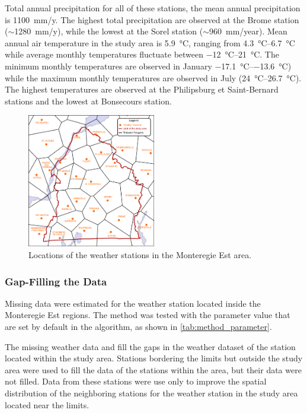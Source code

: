 \documentclass[TechnicalNoteMeteo.tex]{subfiles}
\begin{document}
Total annual precipitation for all of these stations, the mean annual precipitation is \SI{1100}{mm/y}. The highest total precipitation are observed at the Brome station ($\sim$\SI{1280}{mm/y}), while the lowest at the Sorel station ($\sim$\SI{960}{mm/year}). Mean annual air temperature in the study area is \SI{5.9}{\celsius}, ranging from \SIrange{4.3}{6.7}{\celsius} while average monthly temperatures fluctuate between \SIrange{-12}{21}{\celsius}. The minimum monthly temperatures are observed in January \SIrange{-17.1}{-13.6}{\celsius}) while the maximum monthly temperatures are observed in July (\SIrange{24}{26.7}{\celsius}).
The highest temperatures are observed at the Philipsburg et Saint-Bernard stations and the lowest at Bonsecours station.

\begin{figure}
    \centering
    \includegraphics[width=0.5\textwidth]{img/Thiessen_meteo}
    \caption[Locations of the weather stations in the Monteregie Est area.]{Locations of the weather stations in the Monteregie Est area.}
    \label{fig:Thiessen_meteo}
\end{figure}

\subsubsection{Gap-Filling the Data}

Missing data were estimated for the weather station located inside the Monteregie Est regions. The method was tested with the parameter value that are set by default in the algorithm, as shown in \cref{tab:method_parameter}.

The missing weather data and fill the gaps in the weather dataset of the station located within the study area. Stations bordering the limits but outside the study area were used to fill the data of the stations within the area, but their data were not filled. Data from these stations were use only to improve the spatial distribution of the neighboring stations for the weather station in the study area located near the limits.
\end{document}
